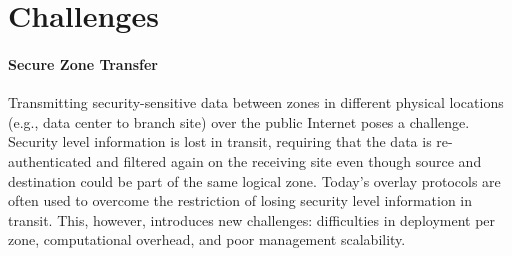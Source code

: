 

\section{Challenges}
\label{sec:challenges}

\paragraph{Secure Zone Transfer}
Transmitting security-sensitive data between zones in different physical locations (e.g.,
data center to branch site) over the public Internet poses a challenge.
Security level information is lost in transit, requiring that the data is re-authenticated and
filtered again on the receiving site even though source and destination could be part of the
same logical zone.
Today's overlay protocols are often used to overcome the restriction of losing
security level information in transit. This, however, introduces new challenges: difficulties
in deployment per zone, computational overhead, and poor management scalability.

